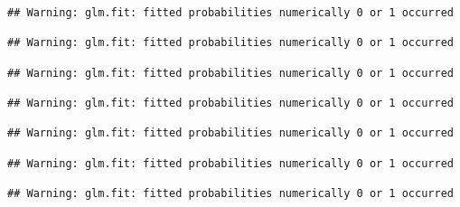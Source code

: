 \documentclass[
]{article}
\newenvironment{Shaded}{\begin{snugshade}}{\end{snugshade}}
\newcommand{\AttributeTok}[1]{\textcolor[rgb]{0.77,0.63,0.00}{#1}}
\newcommand{\CommentTok}[1]{\textcolor[rgb]{0.56,0.35,0.01}{\textit{#1}}}
\newcommand{\DecValTok}[1]{\textcolor[rgb]{0.00,0.00,0.81}{#1}}
\newcommand{\FunctionTok}[1]{\textcolor[rgb]{0.00,0.00,0.00}{#1}}
\newcommand{\NormalTok}[1]{#1}
\newcommand{\OtherTok}[1]{\textcolor[rgb]{0.56,0.35,0.01}{#1}}
\newcommand{\SpecialCharTok}[1]{\textcolor[rgb]{0.00,0.00,0.00}{#1}}
\newcommand{\StringTok}[1]{\textcolor[rgb]{0.31,0.60,0.02}{#1}}
\begin{document}
\begin{verbatim}
## Warning: glm.fit: fitted probabilities numerically 0 or 1 occurred

## Warning: glm.fit: fitted probabilities numerically 0 or 1 occurred

## Warning: glm.fit: fitted probabilities numerically 0 or 1 occurred

## Warning: glm.fit: fitted probabilities numerically 0 or 1 occurred

## Warning: glm.fit: fitted probabilities numerically 0 or 1 occurred

## Warning: glm.fit: fitted probabilities numerically 0 or 1 occurred

## Warning: glm.fit: fitted probabilities numerically 0 or 1 occurred
\end{verbatim}

\begin{Shaded}
\end{Shaded}
\end{document}
